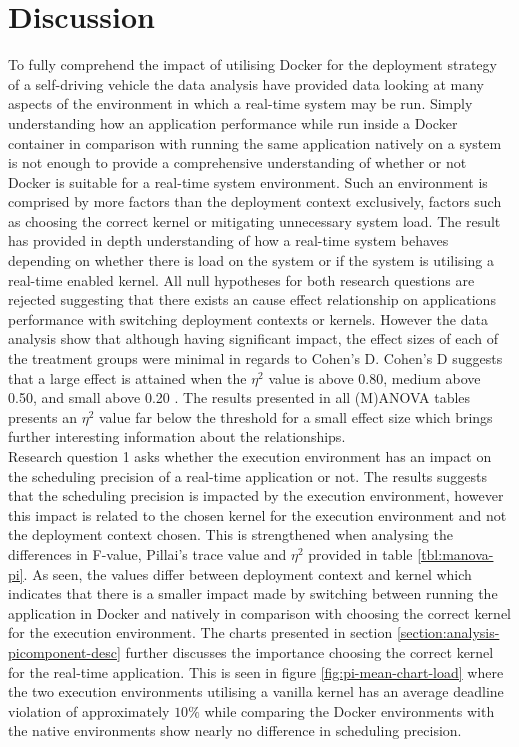 \iffalse  \fi
\chapter{Discussion} \label{section:discussion}

To fully comprehend the impact of utilising Docker for the deployment strategy of a self-driving vehicle the data analysis have provided data looking at many aspects of the environment in which a real-time system may be run. Simply understanding how an application performance while run inside a Docker container in comparison with running the same application natively on a system is not enough to provide a comprehensive understanding of whether or not Docker is suitable for a real-time system environment. Such an environment is comprised by more factors than the deployment context exclusively, factors such as choosing the correct kernel or mitigating unnecessary system load. The result has provided in depth understanding of how a real-time system behaves depending on whether there is load on the system or if the system is utilising a real-time enabled kernel. All null hypotheses for both research questions are rejected suggesting that there exists an cause effect relationship on applications performance with switching deployment contexts or kernels. However the data analysis show that although having significant impact, the effect sizes of each of the treatment groups were minimal in regards to Cohen's D. Cohen's D suggests that a large effect is attained when the $\eta^{2}$ value is above 0.80, medium above 0.50, and small above 0.20 \cite{jackson2013statistics}. The results presented in all (M)ANOVA tables presents an $\eta^{2}$ value far below the threshold for a small effect size which brings further interesting information about the relationships.\\

Research question 1 asks whether the execution environment has an impact on the scheduling precision of a real-time application or not. The results suggests that the scheduling precision is impacted by the execution environment, however this impact is related to the chosen kernel for the execution environment and not the deployment context chosen. This is strengthened when analysing the differences in F-value, Pillai's trace value and $\eta^{2}$ provided in table \ref{tbl:manova-pi}. As seen, the values differ between deployment context and kernel which indicates that there is a smaller impact made by switching between running the application in Docker and natively in comparison with choosing the correct kernel for the execution environment. The charts presented in section \ref{section:analysis-picomponent-desc} further discusses the importance choosing the correct kernel for the real-time application. This is seen in figure \ref{fig:pi-mean-chart-load} where the two execution environments utilising a vanilla kernel has an average deadline violation of approximately $10\%$ while comparing the Docker environments with the native environments show nearly no difference in scheduling precision.\\

